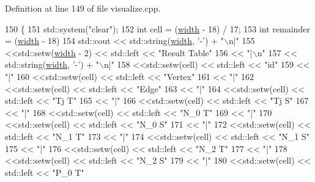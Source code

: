 Definition at line 149 of file visualize.\+cpp.


\begin{DoxyCode}
150 \{
151     std::system(\textcolor{stringliteral}{"clear"});
152     \textcolor{keywordtype}{int} cell = (\hyperlink{class_visualize_af5ac723ad5f8fe8c4a8378bf1299cda7}{width} - 18) / 17;
153     \textcolor{keywordtype}{int} remainder = (\hyperlink{class_visualize_af5ac723ad5f8fe8c4a8378bf1299cda7}{width} - 18) %
154     std::cout << std::string(\hyperlink{class_visualize_af5ac723ad5f8fe8c4a8378bf1299cda7}{width}, \textcolor{charliteral}{'-'}) + \textcolor{stringliteral}{"\(\backslash\)n|"}
155               <<std::setw(\hyperlink{class_visualize_af5ac723ad5f8fe8c4a8378bf1299cda7}{width} - 2) << std::left << \textcolor{stringliteral}{"Result Table"}
156               << \textcolor{stringliteral}{"|\(\backslash\)n"}
157               << std::string(\hyperlink{class_visualize_af5ac723ad5f8fe8c4a8378bf1299cda7}{width}, \textcolor{charliteral}{'-'}) + \textcolor{stringliteral}{"\(\backslash\)n|"}
158               <<std::setw(cell) << std::left << \textcolor{stringliteral}{"id"}
159               << \textcolor{stringliteral}{"|"}
160               <<std::setw(cell) << std::left << \textcolor{stringliteral}{"Vertex"}
161               << \textcolor{stringliteral}{"|"}
162               <<std::setw(cell) << std::left << \textcolor{stringliteral}{"Edge"}
163               << \textcolor{stringliteral}{"|"}
164               <<std::setw(cell) << std::left << \textcolor{stringliteral}{"Tj T"}
165               << \textcolor{stringliteral}{"|"}
166               <<std::setw(cell) << std::left << \textcolor{stringliteral}{"Tj S"}
167               << \textcolor{stringliteral}{"|"}
168               <<std::setw(cell) << std::left << \textcolor{stringliteral}{"N\_0 T"}
169               << \textcolor{stringliteral}{"|"}
170               <<std::setw(cell) << std::left << \textcolor{stringliteral}{"N\_0 S"}
171               << \textcolor{stringliteral}{"|"}
172               <<std::setw(cell) << std::left << \textcolor{stringliteral}{"N\_1 T"}
173               << \textcolor{stringliteral}{"|"}
174               <<std::setw(cell) << std::left << \textcolor{stringliteral}{"N\_1 S"}
175               << \textcolor{stringliteral}{"|"}
176               <<std::setw(cell) << std::left << \textcolor{stringliteral}{"N\_2 T"}
177               << \textcolor{stringliteral}{"|"}
178               <<std::setw(cell) << std::left << \textcolor{stringliteral}{"N\_2 S"}
179               << \textcolor{stringliteral}{"|"}
180               <<std::setw(cell) << std::left << \textcolor{stringliteral}{"P\_0 T"}

\end{DoxyCode}
